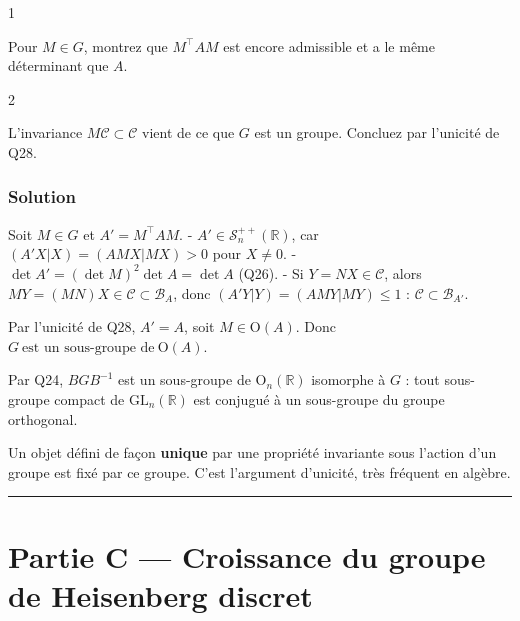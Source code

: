 \documentclass[11pt,a4paper]{article}
\begin{document}
\begin{indication}{1}

Pour \(M\in G\), montrez que \(M^\top AM\) est encore admissible et a le même déterminant que \(A\).

\end{indication}

\begin{indication}{2}

L'invariance \(M\mathcal{C}\subset\mathcal{C}\) vient de ce que \(G\) est un groupe. Concluez par l'unicité de Q28.

\end{indication}

\hypertarget{solution-28}{%
\subsubsection{Solution}\label{solution-28}}

Soit \(M\in G\) et \(A'=M^\top AM\).
- \(A'\in{\mathcal{S}}_n^{++}(\mathbb{R})\), car \((A'X|X)=(AMX|MX)>0\) pour \(X\neq0\).
- \(\det A'=(\det M)^2\det A=\det A\) (Q26).
- Si \(Y=NX\in\mathcal{C}\), alors \(MY=(MN)X\in\mathcal{C}\subset{\mathcal{B}}_A\), donc \((A'Y|Y)=(AMY|MY)\leqslant1\) : \(\mathcal{C}\subset{\mathcal{B}}_{A'}\).

Par l'unicité de Q28, \(A'=A\), soit \(M\in\mathrm{O}(A)\). Donc \(\boxed{G\ \text{est un sous-groupe de}\ \mathrm{O}(A)}\).

Par Q24, \(BGB^{-1}\) est un sous-groupe de \({\mathrm{O}}_n(\mathbb{R})\) isomorphe à \(G\) : tout sous-groupe compact de \({\mathrm{GL}}_n(\mathbb{R})\) est conjugué à un sous-groupe du groupe orthogonal.

\begin{methode}

Un objet défini de façon \textbf{unique} par une propriété invariante sous l'action d'un groupe est fixé par ce groupe. C'est l'argument d'unicité, très fréquent en algèbre.

\end{methode}

\begin{center}\rule{0.5\linewidth}{0.5pt}\end{center}

\hypertarget{partie-c-croissance-du-groupe-de-heisenberg-discret}{%
\section{Partie C --- Croissance du groupe de Heisenberg discret}\label{partie-c-croissance-du-groupe-de-heisenberg-discret}}
\end{document}
